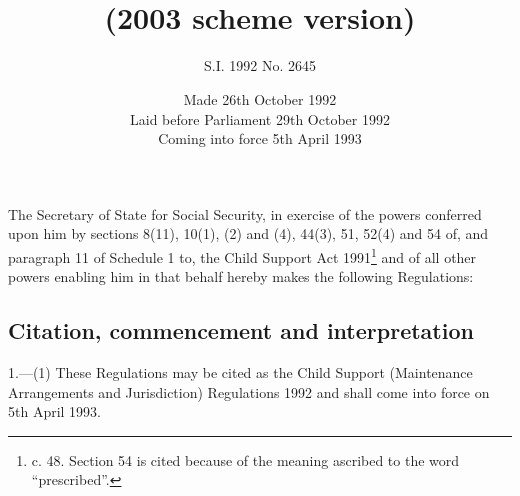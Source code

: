 \documentclass[12pt,a4paper]{article}
\title{\regstitle}
\title{\regstitle\\(2003 scheme version)}
\author{S.I. 1992 No. 2645}
\date{Made 26th October 1992\\Laid before Parliament 29th October 1992\\Coming into force 5th April 1993}
\begin{document}
\maketitle

\noindent
The Secretary of State for Social Security, in exercise of the powers conferred upon him by sections 8(11), 10(1), (2) and (4), 44(3), 51, 52(4) and 54 of, and paragraph 11 of Schedule 1 to, the Child Support Act 1991\footnote{ c. 48. Section 54 is cited because of the meaning ascribed to the word “prescribed”.} and of all other powers enabling him in that behalf hereby makes the following Regulations:


{\sloppy

\tableofcontents

}

\setcounter{secnumdepth}{-2}

\subsection[1. Citation, commencement and interpretation]{Citation, commencement and interpretation}

1.—(1) These Regulations may be cited as the Child Support (Maintenance Arrangements and Jurisdiction) Regulations 1992 and shall come into force on 5th April 1993.
\end{document}
